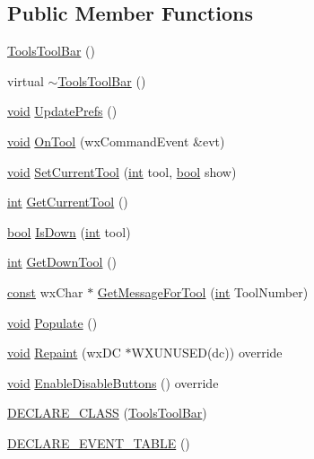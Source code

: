 \subsection*{Public Member Functions}
\begin{DoxyCompactItemize}
\item 
\hyperlink{class_tools_tool_bar_a2b808eb78e0a0ac2fdd9377a5680eb51}{Tools\+Tool\+Bar} ()
\item 
virtual \hyperlink{class_tools_tool_bar_ac5cef538b8171fef7401bd65d701095c}{$\sim$\+Tools\+Tool\+Bar} ()
\item 
\hyperlink{sound_8c_ae35f5844602719cf66324f4de2a658b3}{void} \hyperlink{class_tools_tool_bar_afd3429a743c0a10e6fb07b5c8f1c0fb8}{Update\+Prefs} ()
\item 
\hyperlink{sound_8c_ae35f5844602719cf66324f4de2a658b3}{void} \hyperlink{class_tools_tool_bar_a8f7fd6d2396404655ac46bf45168980b}{On\+Tool} (wx\+Command\+Event \&evt)
\item 
\hyperlink{sound_8c_ae35f5844602719cf66324f4de2a658b3}{void} \hyperlink{class_tools_tool_bar_a0b4b13a933efba2ccbb62bc715efb60f}{Set\+Current\+Tool} (\hyperlink{xmltok_8h_a5a0d4a5641ce434f1d23533f2b2e6653}{int} tool, \hyperlink{mac_2config_2i386_2lib-src_2libsoxr_2soxr-config_8h_abb452686968e48b67397da5f97445f5b}{bool} show)
\item 
\hyperlink{xmltok_8h_a5a0d4a5641ce434f1d23533f2b2e6653}{int} \hyperlink{class_tools_tool_bar_ab31272c8c6e504065e1117d2d47a5bee}{Get\+Current\+Tool} ()
\item 
\hyperlink{mac_2config_2i386_2lib-src_2libsoxr_2soxr-config_8h_abb452686968e48b67397da5f97445f5b}{bool} \hyperlink{class_tools_tool_bar_a2d8c3ea8e829b4e8af34a848dcab38ae}{Is\+Down} (\hyperlink{xmltok_8h_a5a0d4a5641ce434f1d23533f2b2e6653}{int} tool)
\item 
\hyperlink{xmltok_8h_a5a0d4a5641ce434f1d23533f2b2e6653}{int} \hyperlink{class_tools_tool_bar_a446cca61ccf94abbf3acf72307b9d9da}{Get\+Down\+Tool} ()
\item 
\hyperlink{getopt1_8c_a2c212835823e3c54a8ab6d95c652660e}{const} wx\+Char $\ast$ \hyperlink{class_tools_tool_bar_a044a1fdcf73e2c079b604bfdfe59cc35}{Get\+Message\+For\+Tool} (\hyperlink{xmltok_8h_a5a0d4a5641ce434f1d23533f2b2e6653}{int} Tool\+Number)
\item 
\hyperlink{sound_8c_ae35f5844602719cf66324f4de2a658b3}{void} \hyperlink{class_tools_tool_bar_a4cc7878909534f48c01def39236f7c7f}{Populate} ()
\item 
\hyperlink{sound_8c_ae35f5844602719cf66324f4de2a658b3}{void} \hyperlink{class_tools_tool_bar_a07e07c50918dc94390b8ee8c4ed5f069}{Repaint} (wx\+DC $\ast$W\+X\+U\+N\+U\+S\+ED(dc)) override
\item 
\hyperlink{sound_8c_ae35f5844602719cf66324f4de2a658b3}{void} \hyperlink{class_tools_tool_bar_ac0f9fc425231b5d5f587537a00b034f6}{Enable\+Disable\+Buttons} () override
\item 
\hyperlink{class_tools_tool_bar_a38e6716efaef61359c3076bd2a7b736d}{D\+E\+C\+L\+A\+R\+E\+\_\+\+C\+L\+A\+SS} (\hyperlink{class_tools_tool_bar}{Tools\+Tool\+Bar})
\item 
\hyperlink{class_tools_tool_bar_a494b73cffac2dc1186d0e209fcb13620}{D\+E\+C\+L\+A\+R\+E\+\_\+\+E\+V\+E\+N\+T\+\_\+\+T\+A\+B\+LE} ()
\end{DoxyCompactItemize}
